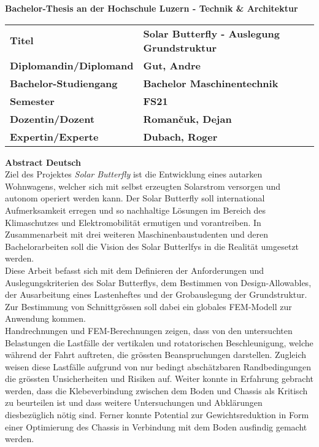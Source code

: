 \vspace{2cm}
\begin{large}
\textbf{Bachelor-Thesis an der Hochschule Luzern - Technik \& Architektur}\\
\end{large}
\vspace{1cm}

\begin{table}[H]
\small
  \begin{tabularx}{\linewidth}{llX}
    \textbf{Titel}                 & \textbf{Solar Butterfly - Auslegung Grundstruktur} &\\[4 mm]
    \textbf{Diplomandin/Diplomand} & \textbf{Gut, Andre}                                &\\[4 mm]
    \textbf{Bachelor-Studiengang}  & \textbf{Bachelor Maschinentechnik}                 &\\[4 mm]
    \textbf{Semester}              & \textbf{FS21}                                      &\\[4 mm]
    \textbf{Dozentin/Dozent}       & \textbf{Roman\v{c}uk, Dejan}                       &\\[4 mm]
    \textbf{Expertin/Experte}      & \textbf{Dubach, Roger}                             &
  \end{tabularx}
\end{table}

\vspace{1.5cm}
\textbf{Abstract Deutsch}\\
Ziel des Projektes \emph{Solar Butterfly} ist die Entwicklung eines autarken Wohnwagens, welcher sich mit selbst erzeugten Solarstrom versorgen und autonom operiert werden kann. Der Solar Butterfly soll international Aufmerksamkeit erregen und so nachhaltige Lösungen im Bereich des Klimaschutzes und Elektromobilität ermutigen und vorantreiben. In Zusammenarbeit mit drei weiteren Maschinenbaustudenten und deren Bachelorarbeiten soll die Vision des Solar Butterlfys in die Realität umgesetzt werden.\\
Diese Arbeit befasst sich mit dem Definieren der Anforderungen und Auslegungskriterien des Solar Butterflys, dem Bestimmen von Design-Allowables, der Ausarbeitung eines Lastenheftes und der Grobauslegung der Grundstruktur. Zur Bestimmung von Schnittgrössen soll dabei ein globales FEM-Modell zur Anwendung kommen.\\
Handrechnungen und FEM-Berechnungen zeigen, dass von den untersuchten Belastungen die Lastfälle der vertikalen und rotatorischen Beschleunigung, welche während der Fahrt auftreten, die grössten Beanspruchungen darstellen. Zugleich weisen diese Lastfälle aufgrund von nur bedingt abschätzbaren Randbedingungen die grössten Unsicherheiten und Risiken auf. Weiter konnte in Erfahrung gebracht werden, dass die Klebeverbindung zwischen dem Boden und Chassis als Kritisch zu beurteilen ist und dass weitere Untersuchungen und Abklärungen diesbezüglich nötig sind.
Ferner konnte Potential zur Gewichtsreduktion in Form einer Optimierung des Chassis in Verbindung mit dem Boden ausfindig gemacht werden.


